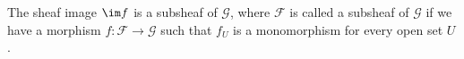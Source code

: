 The sheaf image $\im f$ is a subsheaf of $\mathcal{G}$, where $\mathcal{F}$ is called a
subsheaf of $\mathcal{G}$ if we have a morphism $f\colon \mathcal{F}\to \mathcal{G}$
such that $f_U$ is a monomorphism for every open set $U$.
